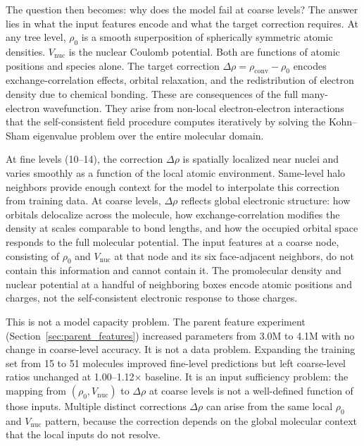 The question then becomes: why does the model fail at coarse levels?
The answer lies in what the input features encode and what the target
correction requires. At any tree level, $\rho_0$ is a smooth
superposition of spherically symmetric atomic densities. $V_\mathrm{nuc}$
is the nuclear Coulomb potential. Both are functions of atomic positions
and species alone. The target correction
$\Delta\rho = \rho_\mathrm{conv} - \rho_0$ encodes
exchange-correlation effects, orbital relaxation, and the redistribution
of electron density due to chemical bonding. These are consequences of
the full many-electron wavefunction. They arise from non-local
electron-electron interactions that the self-consistent field procedure
computes iteratively by solving the Kohn--Sham eigenvalue problem over
the entire molecular domain.

At fine levels (10--14), the correction $\Delta\rho$ is spatially
localized near nuclei and varies smoothly as a function of the local
atomic environment. Same-level halo neighbors provide enough context for
the model to interpolate this correction from training data. At coarse
levels, $\Delta\rho$ reflects global electronic structure: how orbitals
delocalize across the molecule, how exchange-correlation modifies the
density at scales comparable to bond lengths, and how the occupied
orbital space responds to the full molecular potential. The input
features at a coarse node, consisting of $\rho_0$ and $V_\mathrm{nuc}$
at that node and its six face-adjacent neighbors, do not contain this
information and cannot contain it. The promolecular density and nuclear
potential at a handful of neighboring boxes encode atomic positions and
charges, not the self-consistent electronic response to those charges.

This is not a model capacity problem. The parent feature experiment
(Section~\ref{sec:parent_features}) increased parameters from 3.0M to
4.1M with no change in coarse-level accuracy. It is not a data
problem. Expanding the training set from 15 to 51 molecules improved
fine-level predictions but left coarse-level ratios unchanged at
1.00--1.12$\times$ baseline. It is an input sufficiency problem: the
mapping from $(\rho_0, V_\mathrm{nuc})$ to $\Delta\rho$ at coarse
levels is not a well-defined function of those inputs. Multiple
distinct corrections $\Delta\rho$ can arise from the same local
$\rho_0$ and $V_\mathrm{nuc}$ pattern, because the correction depends
on the global molecular context that the local inputs do not resolve.

